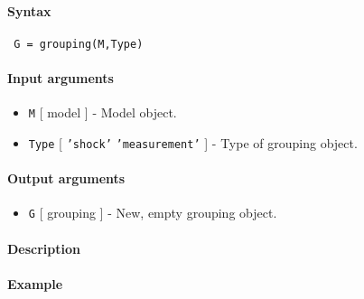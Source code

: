 


	\paragraph{Syntax}
 
 \begin{verbatim}
 G = grouping(M,Type)
 \end{verbatim}
 
 \paragraph{Input arguments}
 
 \begin{itemize}
 \item
   \texttt{M} {[} model {]} - Model object.
 \item
   \texttt{Type} {[} \texttt{'shock'} \textbar{} \texttt{'measurement'}
   {]} - Type of grouping object.
 \end{itemize}
 
 \paragraph{Output arguments}
 
 \begin{itemize}
 \item
   \texttt{G} {[} grouping {]} - New, empty grouping object.
 \end{itemize}
 
 \paragraph{Description}
 
 \paragraph{Example}



